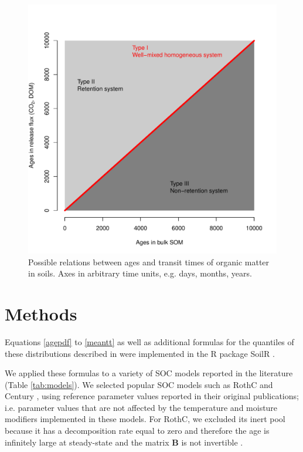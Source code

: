 \documentclass[draft,linenumbers]{agujournal}
\begin{document}
\begin{figure}[t]
   \centering
   \includegraphics[scale=0.75]{Figures/systemTypes} %
   \caption{Possible relations between ages and transit times of organic matter in soils. Axes in arbitrary time units, e.g. days, months, years.}
   \label{fig:hypotheses}
\end{figure}


\section{Methods}
Equations \ref{agepdf} to \ref{meantt} as well as additional formulas for the quantiles of these distributions described in \citet{Metzler2018MG} were implemented in the R package SoilR \citep{Sierra2014GMD}.

We applied these formulas to a variety of SOC models reported in the literature (Table \ref{tab:models}). We selected popular SOC models such as RothC and Century \citep{Jenkinson1990, Parton1987}, using reference parameter values reported in their original publications; i.e. parameter values that are not affected by the temperature and moisture modifiers implemented in these models. For RothC, we excluded its inert pool because it has a decomposition rate equal to zero and therefore the age is infinitely large at steady-state and the matrix $\mathbf{B}$ is not invertible \citep{Metzler2018MG}. 
\end{document}
